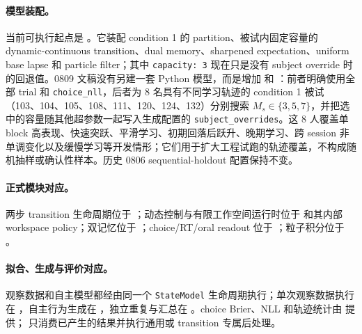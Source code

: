 \paragraph{模型装配。}
当前可执行起点是
。它装配 condition 1 的 partition、被试内固定容量的 dynamic-continuous transition、dual memory、sharpened expectation、uniform base lapse 和 particle filter；其中 \texttt{capacity: 3} 现在只是没有 subject override 时的回退值。0809 文稿没有另建一套 Python 模型，而是增加
和
：前者明确使用全部 trial 和 \texttt{choice\_nll}，后者为 8 名具有不同学习轨迹的 condition 1 被试（103、104、105、108、111、120、124、132）分别搜索 $M_s\in\{3,5,7\}$，并把选中的容量随其他超参数一起写入生成配置的 \texttt{subject\_overrides}。这 8 人覆盖单 block 高表现、快速突跃、平滑学习、初期回落后跃升、晚期学习、跨 session 非单调变化以及缓慢学习等开发情形；它们用于扩大工程试跑的轨迹覆盖，不构成随机抽样或确认性样本。历史 0806 sequential-holdout 配置保持不变。

\paragraph{正式模块对应。}
两步 transition 生命周期位于
；动态控制与有限工作空间运行时位于
和其内部 workspace policy；双记忆位于
；choice/RT/oral readout 位于
；粒子积分位于
。

\paragraph{拟合、生成与评价对应。}
观察数据和自主模型都经由同一个 \texttt{StateModel} 生命周期执行；单次观察数据执行在
，自主行为生成在
，独立重复与汇总在
。choice Brier、NLL 和轨迹统计由
 提供；
 只消费已产生的结果并执行通用或 transition 专属后处理。

